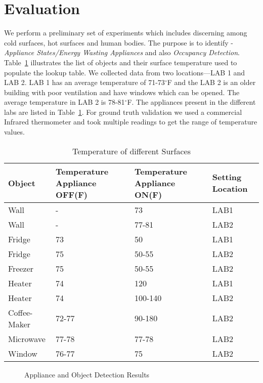  \section{Evaluation}
\label{sec:evaluation}

    We perform a preliminary set of experiments which includes discerning among cold surfaces, hot surfaces and human bodies. The purpose is to identify - \textit{ Appliance States/Energy Wasting Appliances} and also \textit{ Occupancy Detection}. Table~\ref{table:temp} illustrates the list of objects and their surface temperature used to populate the lookup table. We collected data from two locations---LAB 1 and LAB 2. LAB 1 has an average temperature of 71-73$^{\circ}$F and the LAB 2 is an older building with poor ventilation and have windows which can be opened. The average temperature in LAB 2 is 78-81$^{\circ}$F. The appliances present in the different labs are listed in Table~\ref{table:temp}. For ground truth validation we used a commercial Infrared thermometer and took multiple readings to get the range of temperature values.
   

\begin{table}[t!]
\centering
 \begin{tabular}{||p{1.3cm} | p{2cm} | p{2cm} | p{1cm}||}
 \hline
 Object & Temperature Appliance OFF(F) & Temperature Appliance ON(F) & Setting Location\\ [0.5ex]
 \hline\hline
 Wall  & - & 73 & LAB1\\
  \hline\hline
 Wall  & - & 77-81 & LAB2\\
  \hline
 Fridge & 73 & 50 & LAB1 \\
 \hline
 Fridge & 75  & 50-55 & LAB2 \\
 \hline 
 Freezer & 75  & 50-55 & LAB2 \\
 \hline
 Heater & 74 & 120 &  LAB1\\ 
 \hline
  Heater & 74 & 100-140 &  LAB2\\ 
 \hline
 Coffee-Maker & 72-77 & 90-180 &  LAB2\\
 \hline
 Microwave & 77-78 & 77-78 & LAB2\\
 \hline
 Window & 76-77 & 75 & LAB2\\ [1ex]
 \hline
 \end{tabular}
 \label{table:temp}
\caption{Temperature of different Surfaces}
\end{table}

 \begin{figure}[t!]
 	\label{fig:Object Detection}
 	\caption{Appliance and Object Detection Results}
 \end{figure}
 
